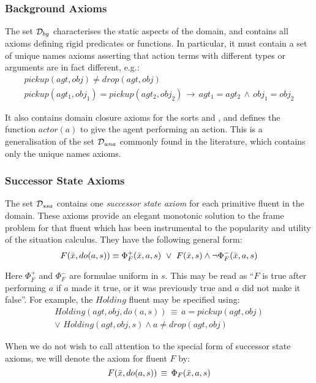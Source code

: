 \subsubsection{Background Axioms}

The set $\mathcal{D}_{bg}$ characterises the static aspects of the domain,
and contains all axioms defining rigid predicates or functions. In
particular, it must contain a set of unique names axioms asserting
that action terms with different types or arguments are in fact different,
e.g.:\begin{gather*}
pickup(agt,obj)\neq drop(agt,obj)\\
pickup(agt_{1},obj_{1})=pickup(agt_{2},obj_{2})\,\rightarrow\, agt_{1}=agt_{2}\,\wedge\, obj_{1}=obj_{2}\end{gather*}


It also contains domain closure axioms for the sorts  and , and defines the function $actor(a)$ to
give the agent performing an action. This is a generalisation of the
set $\mathcal{D}_{una}$ commonly found in the literature, which contains
only the unique names axioms.


\subsubsection{Successor State Axioms}

The set $\mathcal{D}_{ssa}$ contains one \emph{successor state axiom} for
each primitive fluent in the domain. These axioms provide an elegant
monotonic solution to the frame problem for that fluent \citep{reiter91frameprob}
which has been instrumental to the popularity and utility of the situation
calculus. They have the following general form: \[
F(\bar{x},do(a,s))\equiv\Phi_{F}^{+}(\bar{x},a,s)\,\,\vee\,\, F(\bar{x},s)\wedge\neg\Phi_{F}^{-}(\bar{x},a,s)\]


Here $\Phi_{F}^{+}$ and $\Phi_{F}^{-}$ are formulae uniform in $s$.
This may be read as {}``$F$ is true after performing $a$ if $a$
made it true, or it was previously true and $a$ did not make it false''.
For example, the $Holding$ fluent may be specified using:\begin{multline*}
Holding(agt,obj,do(a,s))\,\equiv\, a=pickup(agt,obj)\\
\vee\,\, Holding(agt,obj,s)\wedge a\neq drop(agt,obj)\end{multline*}


When we do not wish to call attention to the special form of successor
state axioms, we will denote the axiom for fluent $F$ by:\[
F(\bar{x},do(a,s))\,\equiv\,\Phi_{F}(\bar{x},a,s)\]


